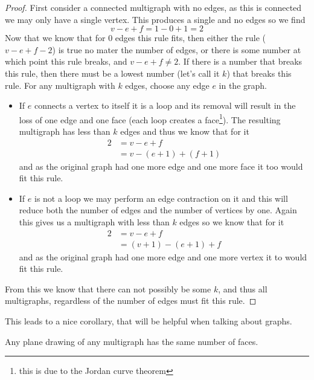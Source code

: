 \documentclass{article}
\begin{document}


\begin{proof}
	First consider a connected multigraph with no edges, as this is connected we may only have a single vertex. This produces a single and no edges so we find $$v-e+f=1-0+1=2$$ Now that we know that for 0 edges this rule fits, then either the rule ($v-e+f-2$) is true no mater the number of edges, or there is some number at which point this rule breaks, and $v-e+f\not=2$. If there is a number that breaks this rule, then there must be a lowest number (let's call it $k$) that breaks this rule. For any multigraph with $k$ edges, choose any edge $e$ in the graph.
	\begin{itemize}
		\item If $e$ connects a vertex to itself it is a loop and its removal will result in the loss of one edge and one face (each loop creates a face\footnote{this is due to the Jordan curve theorem}). The resulting multigraph has less than $k$ edges and thus we know that for it \begin{align*}2&=v-e+f \\&= v-(e+1)+(f+1)\end{align*} and as the original graph had one more edge and one more face it too would fit this rule.
		\item If $e$ is not a loop we may perform an edge contraction on it and this will reduce both the number of edges and the number of vertices by one. Again this gives us a multigraph with less than $k$ edges so we know that for it \begin{align*}2&=v-e+f\\&=(v+1)-(e+1)+f\end{align*} and as the original graph had one more edge and one more vertex it to would fit this rule.
	\end{itemize}
	
	From this we know that there can not possibly be some $k$, and thus all multigraphs, regardless of the number of edges must fit this rule.
\end{proof}
This leads to a nice corollary, that will be helpful when talking about graphs.
\begin{corallary}
	Any plane drawing of any multigraph has the same number of faces.
\end{corallary}
\end{document}
